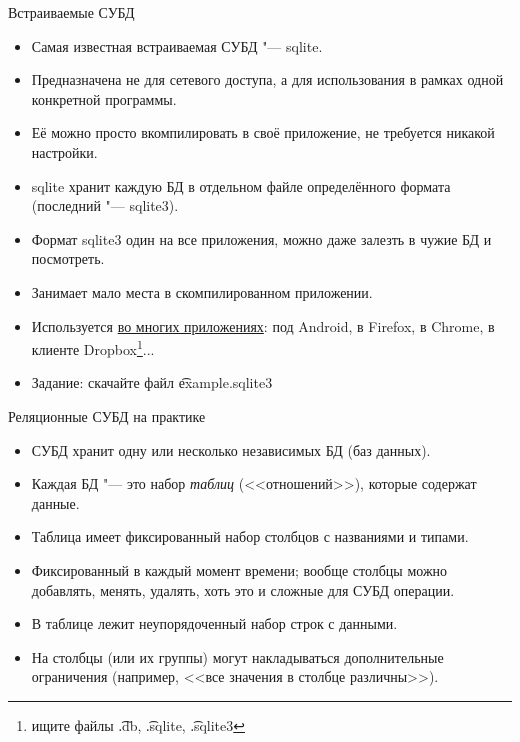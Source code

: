 \begin{frame}{Встраиваемые СУБД}
	\begin{itemize}
		\item Самая известная встраиваемая СУБД "--- sqlite.
		\item Предназначена не для сетевого доступа, а для использования в рамках одной конкретной программы.
		\item Её можно просто вкомпилировать в своё приложение, не требуется никакой настройки.
		\item sqlite хранит каждую БД в отдельном файле определённого формата (последний "--- sqlite3).
		\item Формат sqlite3 один на все приложения, можно даже залезть в чужие БД и посмотреть.
		\item Занимает мало места в скомпилированном приложении.
		\item
			Используется \href{http://www.sqlite.org/famous.html}{во многих приложениях}:
			под Android, в Firefox, в Chrome, в клиенте Dropbox\footnote{ищите файлы \t{.db}, \t{.sqlite}, \t{.sqlite3}}...
		\item Задание: скачайте файл \t{example.sqlite3}
	\end{itemize}
\end{frame}

\begin{frame}{Реляционные СУБД на практике}
	\begin{itemize}
		\item СУБД хранит одну или несколько независимых БД (баз данных).
		\item Каждая БД "--- это набор \textit{таблиц} (<<отношений>>), которые содержат данные.
		\item Таблица имеет фиксированный набор столбцов с названиями и типами.
		\item Фиксированный в каждый момент времени; вообще столбцы можно добавлять, менять, удалять, хоть это и сложные для СУБД операции.
		\item В таблице лежит неупорядоченный набор строк с данными.
		\item На столбцы (или их группы) могут накладываться дополнительные ограничения (например, <<все значения в столбце различны>>).
	\end{itemize}
\end{frame}
